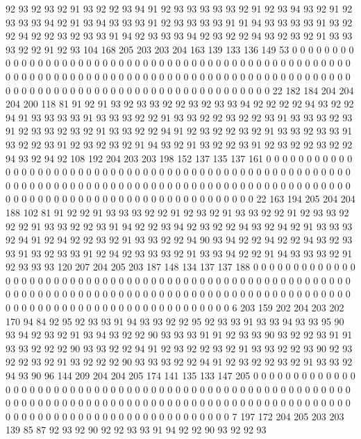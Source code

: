 92 93 92 93 92 91 93 92 92 93 94 91 92 93 93 93 93 93 92 91
92 93 94 93 92 91 92 93 93 93 94 92 91 93 94 93 93 93 91 92
93 93 93 93 91 91 94 93 93 93 93 91 93 92 92 94 92 92 93 92
93 93 91 94 92 93 93 93 94 92 93 92 92 94 93 92 93 92 91 93
93 93 92 92 91 92 93 104 168 205 203 203 204 163 139 133 136 149 53 0
0 0 0 0 0 0 0 0 0 0 0 0 0 0 0 0 0 0 0 0
0 0 0 0 0 0 0 0 0 0 0 0 0 0 0 0 0 0 0 0
0 0 0 0 0 0 0 0 0 0 0 0 0 0 0 0 0 0 0 0
0 0 0 0 0 0 0 0 0 0 0 0 0 0 0 0 0 0 0 0
0 0 0 0 0 0 0 0 0 0 0 0 0 0 0 0 0 0 0 0
0 0 0 0 0 0 0 0 0 0 0 0 0 0 0 0 0 0 0 0
0 0 0 0 0 0 22 182 184 204 204 204 200 118 81 91 92 91 93 92
93 93 92 92 93 92 93 93 94 92 92 92 92 94 93 92 92 94 91 93
93 93 93 91 93 93 93 92 92 91 93 93 92 92 93 92 92 93 91 93
93 93 92 93 91 92 93 93 92 93 92 91 93 93 92 92 94 91 92 93
92 92 93 92 91 93 93 92 93 93 91 93 92 92 93 91 92 93 92 93
92 91 94 93 92 91 93 92 92 93 91 92 93 92 92 93 92 92 94 93
92 94 92 108 192 204 203 203 198 152 137 135 137 161 0 0 0 0 0 0
0 0 0 0 0 0 0 0 0 0 0 0 0 0 0 0 0 0 0 0
0 0 0 0 0 0 0 0 0 0 0 0 0 0 0 0 0 0 0 0
0 0 0 0 0 0 0 0 0 0 0 0 0 0 0 0 0 0 0 0
0 0 0 0 0 0 0 0 0 0 0 0 0 0 0 0 0 0 0 0
0 0 0 0 0 0 0 0 0 0 0 0 0 0 0 0 0 0 0 0
0 0 0 0 0 0 0 0 0 0 0 0 0 0 0 0 0 0 0 0
0 0 22 163 194 205 204 204 188 102 81 91 92 92 91 93 93 93 92 92
91 92 93 92 91 93 93 92 92 91 92 93 93 92 92 92 91 93 93 92
92 93 91 94 92 92 93 94 92 93 92 92 94 93 92 94 92 91 93 93
93 92 94 91 92 94 92 92 93 92 91 93 93 92 92 94 90 93 94 92
92 94 92 92 94 93 92 93 93 91 93 92 93 93 91 92 94 92 93 93
93 92 91 93 93 94 92 92 91 94 93 93 93 92 91 92 93 93 93 120
207 204 205 203 187 148 134 137 137 188 0 0 0 0 0 0 0 0 0 0
0 0 0 0 0 0 0 0 0 0 0 0 0 0 0 0 0 0 0 0
0 0 0 0 0 0 0 0 0 0 0 0 0 0 0 0 0 0 0 0
0 0 0 0 0 0 0 0 0 0 0 0 0 0 0 0 0 0 0 0
0 0 0 0 0 0 0 0 0 0 0 0 0 0 0 0 0 0 0 0
0 0 0 0 0 0 0 0 0 0 0 0 0 0 0 0 0 0 0 0
0 0 0 0 0 0 0 0 0 0 0 0 0 0 0 0 0 6 203 159
202 204 203 202 170 94 84 92 95 92 93 93 91 94 93 93 92 92 95 92
93 93 91 93 93 94 93 93 95 90 93 94 92 93 92 91 93 94 93 92
92 90 93 93 93 91 91 92 93 93 90 93 92 92 93 91 91 93 93 92
92 92 90 93 93 92 92 94 91 92 93 92 92 93 92 91 93 93 92 92
93 90 92 93 92 92 93 92 91 93 92 92 92 90 93 93 93 92 92 94
91 92 93 92 92 93 92 91 93 93 92 94 93 90 96 144 209 204 204 205
174 141 135 133 147 205 0 0 0 0 0 0 0 0 0 0 0 0 0 0
0 0 0 0 0 0 0 0 0 0 0 0 0 0 0 0 0 0 0 0
0 0 0 0 0 0 0 0 0 0 0 0 0 0 0 0 0 0 0 0
0 0 0 0 0 0 0 0 0 0 0 0 0 0 0 0 0 0 0 0
0 0 0 0 0 0 0 0 0 0 0 0 0 0 0 0 0 0 0 0
0 0 0 0 0 0 0 0 0 0 0 0 0 0 0 0 0 0 0 0
0 0 0 0 0 0 0 0 0 0 0 0 0 7 197 172 204 205 203 203
139 85 87 92 93 92 90 92 92 93 93 91 94 92 92 90 93 92 92 93
